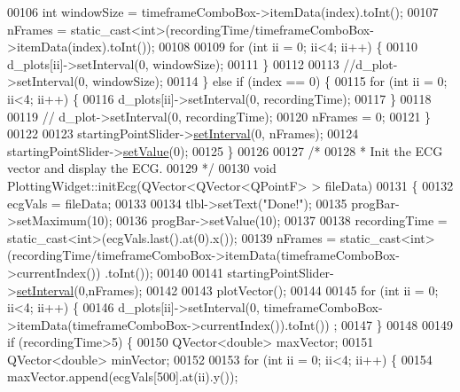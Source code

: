 \begin{DoxyCode}
00106         \textcolor{keywordtype}{int} windowSize = timeframeComboBox->itemData(index).toInt();
00107         nFrames = \textcolor{keyword}{static\_cast<}\textcolor{keywordtype}{int}\textcolor{keyword}{>}(recordingTime/timeframeComboBox->itemData(index).toInt());
00108 
00109         \textcolor{keywordflow}{for} (\textcolor{keywordtype}{int} ii = 0; ii<4; ii++) \{
00110             d\_plots[ii]->setInterval(0, windowSize);
00111         \}
00112 
00113         \textcolor{comment}{//d\_plot->setInterval(0, windowSize);}
00114     \} \textcolor{keywordflow}{else} \textcolor{keywordflow}{if} (index == 0) \{
00115         \textcolor{keywordflow}{for} (\textcolor{keywordtype}{int} ii = 0; ii<4; ii++) \{
00116             d\_plots[ii]->setInterval(0, recordingTime);
00117         \}
00118 
00119         \textcolor{comment}{// d\_plot->setInterval(0, recordingTime);}
00120         nFrames = 0;
00121     \}
00122 
00123     startingPointSlider->\hyperlink{classSliderWidget_aeb088af9a4577c8ca1e64a06bd74eaa1}{setInterval}(0, nFrames);
00124     startingPointSlider->\hyperlink{classSliderWidget_ad69dd98151b2132011341f7ae7799480}{setValue}(0);
00125 \}
00126 
00127 \textcolor{comment}{/*}
00128 \textcolor{comment}{ * Init the ECG vector and display the ECG.}
00129 \textcolor{comment}{ */}
00130 \textcolor{keywordtype}{void} PlottingWidget::initEcg(QVector<QVector<QPointF> > fileData)
00131 \{
00132     ecgVals = fileData;
00133 
00134     tlbl->setText(\textcolor{stringliteral}{"Done!"});
00135     progBar->setMaximum(10);
00136     progBar->setValue(10);
00137 
00138     recordingTime = \textcolor{keyword}{static\_cast<}\textcolor{keywordtype}{int}\textcolor{keyword}{>}(ecgVals.last().at(0).x());
00139     nFrames = \textcolor{keyword}{static\_cast<}\textcolor{keywordtype}{int}\textcolor{keyword}{>}(recordingTime/timeframeComboBox->itemData(timeframeComboBox->currentIndex())
      .toInt());
00140 
00141     startingPointSlider->\hyperlink{classSliderWidget_aeb088af9a4577c8ca1e64a06bd74eaa1}{setInterval}(0,nFrames);
00142 
00143     plotVector();
00144 
00145     \textcolor{keywordflow}{for} (\textcolor{keywordtype}{int} ii = 0; ii<4; ii++) \{
00146         d\_plots[ii]->setInterval(0, timeframeComboBox->itemData(timeframeComboBox->currentIndex()).toInt())
      ;
00147     \}
00148 
00149     \textcolor{keywordflow}{if} (recordingTime>5) \{
00150         QVector<double> maxVector;
00151         QVector<double> minVector;
00152 
00153         \textcolor{keywordflow}{for} (\textcolor{keywordtype}{int} ii = 0; ii<4; ii++) \{
00154             maxVector.append(ecgVals[500].at(ii).y());

\end{DoxyCode}

